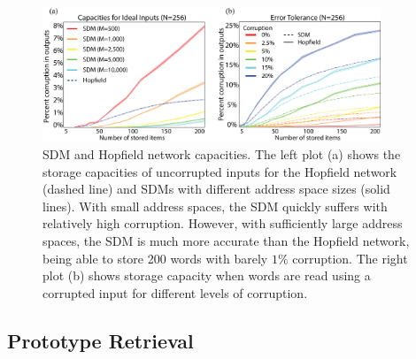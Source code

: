 \documentclass[10pt,letterpaper]{article}
\begin{document}
\begin{figure}[h!]
  \begin{center}
    \includegraphics[width=0.9\textwidth]{./figures/all-capacities.png}
    \caption{SDM and Hopfield network capacities. The left plot (a)
      shows the storage capacities of uncorrupted inputs for the
      Hopfield network (dashed line) and SDMs with different address
      space sizes (solid lines). With small address spaces, the SDM
      quickly suffers with relatively high corruption. However, with
      sufficiently large address spaces, the SDM is much more accurate
      than the Hopfield network, being able to store 200 words with
      barely $1\%$ corruption. The right plot (b) shows storage
      capacity when words are read using a corrupted input for
      different levels of corruption.}
    \label{fig:capacity}
  \end{center}
\end{figure}



\subsection{Prototype Retrieval}
\end{document}
